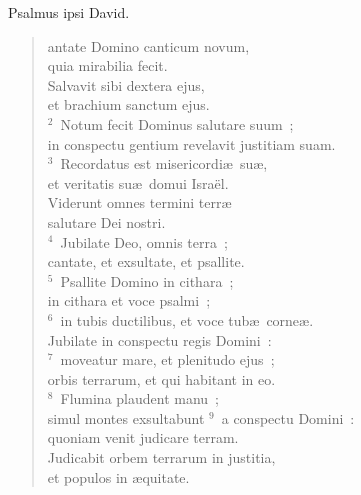 \bchapter[Psalm]
Psalmus ipsi David. \begin{verse}antate Domino canticum novum,\\ quia mirabilia fecit.\\ Salvavit sibi dextera ejus,\\ et brachium sanctum ejus.\\
${}^{2}$~Notum fecit Dominus salutare suum~;\\ in conspectu gentium revelavit justitiam suam.\\
${}^{3}$~Recordatus est misericordi\ae\ su\ae ,\\ et veritatis su\ae\ domui Isra\"el.\\ Viderunt omnes termini terr\ae \\ salutare Dei nostri.\\
${}^{4}$~Jubilate Deo, omnis terra~;\\ cantate, et exsultate, et psallite.\\
${}^{5}$~Psallite Domino in cithara~;\\ in cithara et voce psalmi~;\\
${}^{6}$~in tubis ductilibus, et voce tub\ae\ corne\ae .\\ Jubilate in conspectu regis Domini~:\\
${}^{7}$~moveatur mare, et plenitudo ejus~;\\ orbis terrarum, et qui habitant in eo.\\
${}^{8}$~Flumina plaudent manu~;\\ simul montes exsultabunt
${}^{9}$~a conspectu Domini~:\\ quoniam venit judicare terram.\\ Judicabit orbem terrarum in justitia,\\ et populos in \ae quitate.\end{verse}



